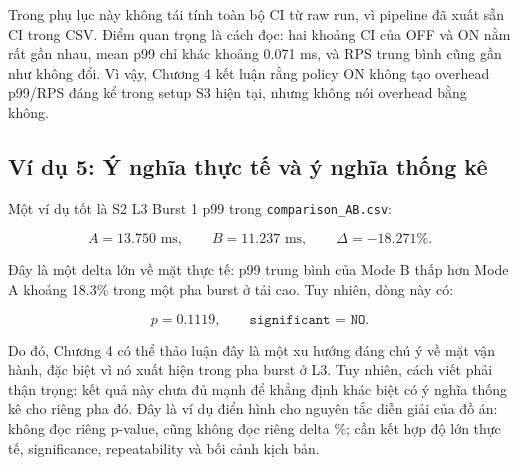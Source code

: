 Trong phụ lục này không tái tính toàn bộ CI từ raw run, vì pipeline đã xuất sẵn CI trong CSV. Điểm quan trọng là cách đọc: hai khoảng CI của OFF và ON nằm rất gần nhau, mean p99 chỉ khác khoảng 0.071 ms, và RPS trung bình cũng gần như không đổi. Vì vậy, Chương 4 kết luận rằng policy ON không tạo overhead p99/RPS đáng kể trong setup S3 hiện tại, nhưng không nói overhead bằng không.

\subsection{Ví dụ 5: Ý nghĩa thực tế và ý nghĩa thống kê}

Một ví dụ tốt là S2 L3 Burst 1 p99 trong \texttt{comparison\_AB.csv}:

\[
A = 13.750 \text{ ms}, \qquad B = 11.237 \text{ ms}, \qquad \Delta = -18.271\%.
\]

Đây là một delta lớn về mặt thực tế: p99 trung bình của Mode B thấp hơn Mode A khoảng 18.3\% trong một pha burst ở tải cao. Tuy nhiên, dòng này có:

\[
p = 0.1119, \qquad \texttt{significant = NO}.
\]

Do đó, Chương 4 có thể thảo luận đây là một xu hướng đáng chú ý về mặt vận hành, đặc biệt vì nó xuất hiện trong pha burst ở L3. Tuy nhiên, cách viết phải thận trọng: kết quả này chưa đủ mạnh để khẳng định khác biệt có ý nghĩa thống kê cho riêng pha đó. Đây là ví dụ điển hình cho nguyên tắc diễn giải của đồ án: không đọc riêng p-value, cũng không đọc riêng delta \%; cần kết hợp độ lớn thực tế, significance, repeatability và bối cảnh kịch bản.

